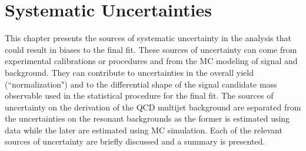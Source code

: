 \chapter{Systematic Uncertainties} \label{chap:systematics}

This chapter presents the sources of systematic uncertainty in
the analysis that could result in biases to the final fit.  These sources of
uncertainty can come from experimental calibrations or procedures and from the
MC modeling of signal and background. They can contribute to uncertainties in
the overall yield (``normalization") and to the differential shape of the
signal candidate mass observable used in the statistical procedure for the
final fit.  The sources of uncertainty on the derivation of the QCD multijet
background are separated from the uncertainties on the resonant backgrounds as
the former is estimated using data while the later are estimated using MC
simulation.  Each of the relevant sources of uncertainty are briefly discussed
and a summary is presented.




